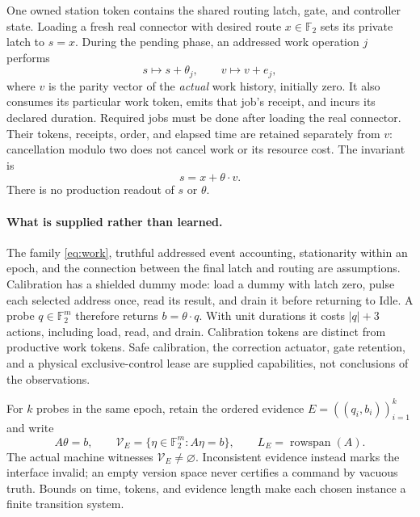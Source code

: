 \documentclass[11pt,a4paper]{article}
\theoremstyle{definition}
\newcommand{\F}{\mathbb F_2}
\newcommand{\row}{\operatorname{rowspan}}
\newcommand{\V}{\mathcal V}
\begin{document}
One owned station token contains the shared routing latch, gate, and
controller state. Loading a fresh real connector with desired route
$x\in\F$ sets its private latch to $s=x$. During the pending phase, an
addressed work operation $j$ performs
\begin{equation}\label{eq:work}
 s\longmapsto s+\theta_j,\qquad
 v\longmapsto v+e_j,
\end{equation}
where $v$ is the parity vector of the \emph{actual} work history, initially
zero. It also consumes its particular work token, emits that job's receipt,
and incurs its declared duration. Required jobs must be done after loading
the real connector. Their tokens, receipts, order, and elapsed time are
retained separately from $v$: cancellation modulo two does not cancel work
or its resource cost. The invariant is
\begin{equation}\label{eq:invariant}
                  s=x+\theta\mathbin{\cdot}v.
\end{equation}
There is no production readout of $s$ or $\theta$.

\paragraph{What is supplied rather than learned.}
The family \eqref{eq:work}, truthful addressed event accounting, stationarity
within an epoch, and the connection between the final latch and routing are
assumptions. Calibration has a shielded dummy mode: load a dummy with latch
zero, pulse each selected address once, read its result, and drain it before
returning to Idle. A probe $q\in\F^m$ therefore returns
$b=\theta\cdot q$. With unit durations it costs $|q|+3$ actions, including
load, read, and drain. Calibration tokens are distinct from productive work
tokens. Safe calibration, the correction actuator, gate retention, and a
physical exclusive-control lease are supplied capabilities, not conclusions
of the observations.

For $k$ probes in the same epoch, retain the ordered evidence
$E=((q_i,b_i))_{i=1}^k$ and write
\[
 A\theta=b,\qquad
 \V_E=\{\eta\in\F^m:A\eta=b\},\qquad L_E=\row(A).
\]
The actual machine witnesses $\V_E\ne\varnothing$. Inconsistent evidence
instead marks the interface invalid; an empty version space never certifies
a command by vacuous truth. Bounds on time, tokens, and evidence length make
each chosen instance a finite transition system.
\end{document}
